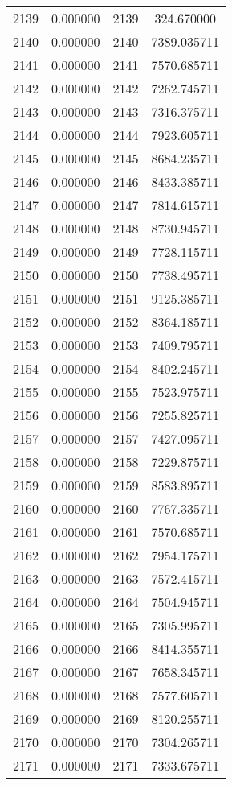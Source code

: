 \documentclass[12pt]{article}
\begin{document}
\begin{longtable}{@{}cccc@{}}
2139 & 0.000000 & 2139 & 324.670000 \\
2140 & 0.000000 & 2140 & 7389.035711 \\
2141 & 0.000000 & 2141 & 7570.685711 \\
2142 & 0.000000 & 2142 & 7262.745711 \\
2143 & 0.000000 & 2143 & 7316.375711 \\
2144 & 0.000000 & 2144 & 7923.605711 \\
2145 & 0.000000 & 2145 & 8684.235711 \\
2146 & 0.000000 & 2146 & 8433.385711 \\
2147 & 0.000000 & 2147 & 7814.615711 \\
2148 & 0.000000 & 2148 & 8730.945711 \\
2149 & 0.000000 & 2149 & 7728.115711 \\
2150 & 0.000000 & 2150 & 7738.495711 \\
2151 & 0.000000 & 2151 & 9125.385711 \\
2152 & 0.000000 & 2152 & 8364.185711 \\
2153 & 0.000000 & 2153 & 7409.795711 \\
2154 & 0.000000 & 2154 & 8402.245711 \\
2155 & 0.000000 & 2155 & 7523.975711 \\
2156 & 0.000000 & 2156 & 7255.825711 \\
2157 & 0.000000 & 2157 & 7427.095711 \\
2158 & 0.000000 & 2158 & 7229.875711 \\
2159 & 0.000000 & 2159 & 8583.895711 \\
2160 & 0.000000 & 2160 & 7767.335711 \\
2161 & 0.000000 & 2161 & 7570.685711 \\
2162 & 0.000000 & 2162 & 7954.175711 \\
2163 & 0.000000 & 2163 & 7572.415711 \\
2164 & 0.000000 & 2164 & 7504.945711 \\
2165 & 0.000000 & 2165 & 7305.995711 \\
2166 & 0.000000 & 2166 & 8414.355711 \\
2167 & 0.000000 & 2167 & 7658.345711 \\
2168 & 0.000000 & 2168 & 7577.605711 \\
2169 & 0.000000 & 2169 & 8120.255711 \\
2170 & 0.000000 & 2170 & 7304.265711 \\
2171 & 0.000000 & 2171 & 7333.675711 \\

\end{longtable}
\end{document}
